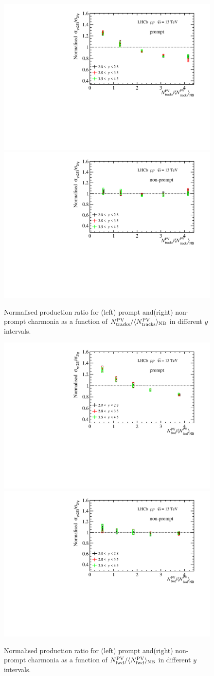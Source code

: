 \documentclass[12pt,a4paper]{article}
\begin{document}
\begin{figure}[H]
  \begin{center}

    \includegraphics[width=0.48\linewidth]{pdf/Result/promptRatioY.pdf}
    \includegraphics[width=0.48\linewidth]{pdf/Result/frombRatioY.pdf}
	  \vspace*{-0.5cm}
  \end{center}
	\caption{Normalised production ratio for (left) prompt and(right) non-prompt charmonia as a function of $N_{\rm tracks}^{\rm PV}/\langle N_{\rm tracks}^{\rm PV}\rangle_{\rm{NB}}$ in different $y$ intervals.}
  \label{RatioY}
\end{figure}

\begin{figure}[H]
  \begin{center}
	  \vspace*{-0.5cm}
    \includegraphics[width=0.48\linewidth]{pdf/Result/promptRatioYF.pdf}
    \includegraphics[width=0.48\linewidth]{pdf/Result/frombRatioYF.pdf}
	  \vspace*{-0.5cm}
  \end{center}
	\caption{Normalised production ratio for (left) prompt and(right) non-prompt charmonia as a function of $N_{\rm fwd}^{\rm PV}/\langle N_{\rm fwd}^{\rm PV}\rangle_{\rm{NB}}$ in different $y$ intervals.}
  \label{RatioY_For}
\end{figure}
\end{document}
